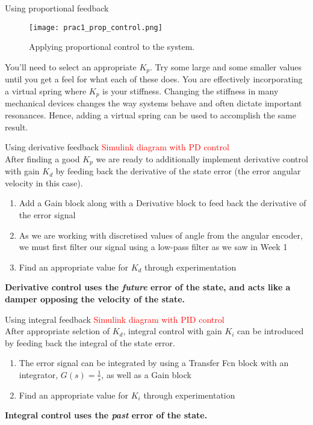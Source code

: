 \documentclass[9pt]{beamer-control}
\begin{document}
\begin{frame}{Using proportional feedback}
	\begin{figure}
		\centering
		\texttt{[image: prac1\_prop\_control.png]}
		\caption{Applying proportional control to the system.}
	\end{figure}
	You’ll need to select an appropriate $K_p.$ Try some large and some smaller values until you get a feel for what each of these does. You are effectively incorporating a virtual spring where $K_p$ is your stiffness. Changing the stiffness in many mechanical devices changes the way systems behave and often dictate important resonances. Hence, adding a virtual spring can be used to accomplish the same result.
\end{frame}




\begin{frame}{Using derivative feedback}
\textcolor{red}{Simulink diagram with PD control}\\
After finding a good $K_p$ we are ready to additionally implement derivative control with gain $K_d$ by feeding back the derivative of the state error (the error angular velocity in this case).

\begin{enumerate}
	\item Add a Gain block along with a Derivative block to feed back the derivative of the error signal
	\item As we are working with discretised values of angle from the angular encoder, we must first filter our signal using a low-pass filter as we saw in Week 1
	\item Find an appropriate value for $K_d$ through experimentation
\end{enumerate}

\textbf{Derivative control uses the \textit{future} error of the state, and acts like a damper opposing the velocity of the state.}
\end{frame}


\begin{frame}{Using integral feedback}
\textcolor{red}{Simulink diagram with PID control}\\
After appropriate selction of $K_d$, integral control with gain $K_i$ can be introduced by feeding back the integral of the state error. 

\begin{enumerate}
	\item The error signal can be integrated by using a Transfer Fcn block with an integrator, $G(s)=\tfrac{1}{s}$, as well as a Gain block
	\item Find an appropriate value for $K_i$ through experimentation
\end{enumerate}


\textbf{Integral control uses the \textit{past} error of the state.}
\end{frame}
\end{document}
